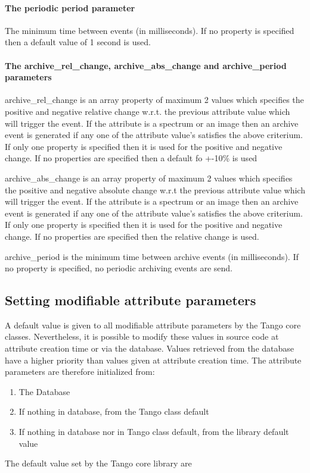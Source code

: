 \paragraph{The periodic period parameter}

The minimum time between events (in milliseconds). If no property
is specified then a default value of 1 second is used.

\paragraph{The archive\_rel\_change, archive\_abs\_change
and archive\_period parameters}

archive\_rel\_change is an array property of maximum 2 values which
specifies the positive and negative relative change w.r.t. the previous
attribute value which will trigger the event. If the attribute is
a spectrum or an image then an archive event is generated if any one
of the attribute value's satisfies the above criterium. If only one
property is specified then it is used for the positive and negative
change. If no properties are specified then a default fo +-10\% is
used

archive\_abs\_change is an array property of maximum 2 values which
specifies the positive and negative absolute change w.r.t the previous
attribute value which will trigger the event. If the attribute is
a spectrum or an image then an archive event is generated if any one
of the attribute value's satisfies the above criterium. If only one
property is specified then it is used for the positive and negative
change. If no properties are specified then the relative change is
used.

archive\_period is the minimum time between archive events (in milliseconds).
If no property is specified, no periodic archiving events are send.

\subsection{Setting modifiable attribute parameters}

A default value is given to all modifiable attribute parameters by
the Tango core classes. Nevertheless, it is possible to modify these
values in source code at attribute creation time or via the database.
Values retrieved from the database have a higher priority than values
given at attribute creation time. The attribute parameters are therefore
initialized from:
\begin{enumerate}
\item The Database
\item If nothing in database, from the Tango class default
\item If nothing in database nor in Tango class default, from the library
default value
\end{enumerate}
The default value set by the Tango core library are

